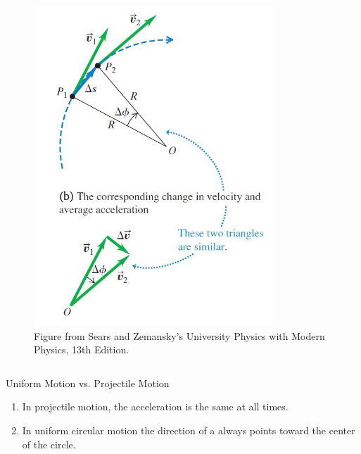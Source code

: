\documentclass[]{beamer}
\begin{document}
\begin{frame}
\begin{columns}[c]
   
         \begin{figure}[h!]  
             \includegraphics[width=0.8\textwidth]{images/27.jpg}
             \caption{ {\tiny Figure from Sears and Zemansky's University Physics 
             with Modern Physics, 13th Edition.} }
           \end{figure}
           
           
           
            
      
         \end{columns}
 
     
       \end{frame}





\begin{frame}

    Uniform Motion vs. Projectile Motion

            
   

         \begin{enumerate}
            \item In projectile motion, the acceleration is the same at all times.
            \item In uniform circular motion the direction of a  always points
            toward the center of the circle.
        \end{enumerate}
          

     
       \end{frame}
\end{document}
